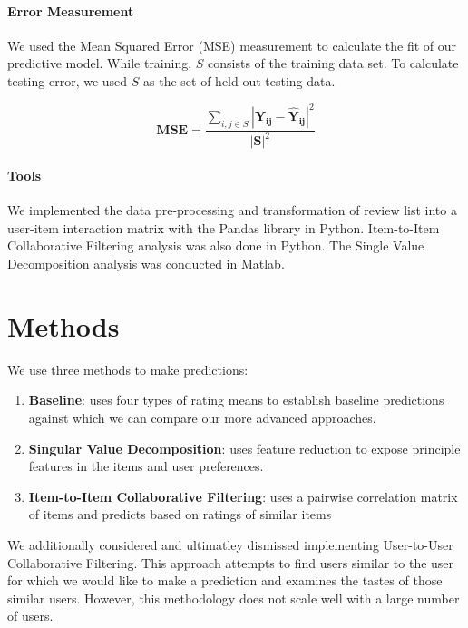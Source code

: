 \documentclass[12pt]{article}
\begin{document}
\paragraph{Error Measurement}
We used the Mean Squared Error (MSE) measurement to calculate the fit of our predictive model. While training, $S$ consists of the training data set. To calculate testing error, we used $S$ as the set of held-out testing data.

$$ \mathbf{MSE} = \frac{\sum\limits_{i,j \in S} {\mathbf{|Y_{ij} - \hat{Y}_{ij}|}}^2}{{\mathbf{|S|}}^2} $$

\paragraph{Tools}
We implemented the data pre-processing and transformation of review list into a user-item interaction matrix with the Pandas library in Python. Item-to-Item Collaborative Filtering analysis was also done in Python. The Single Value Decomposition analysis was conducted in Matlab.

\section{Methods}
We use three methods to make predictions:

\begin{enumerate}
  \item \textbf{Baseline}: uses four types of rating means to establish baseline predictions against which we can compare our more advanced approaches.
  \item \textbf{Singular Value Decomposition}: uses feature reduction to expose principle features in the items and user preferences.
  \item \textbf{Item-to-Item Collaborative Filtering}: uses a pairwise correlation matrix of items and predicts based on ratings of similar items
\end{enumerate}

We additionally considered and ultimatley dismissed implementing User-to-User Collaborative Filtering. This approach attempts to find users similar to the user for which we would like to make a prediction and examines the tastes of those similar users. However, this methodology does not scale well with a large number of users.\textsuperscript{\cite{linden}}
\end{document}
